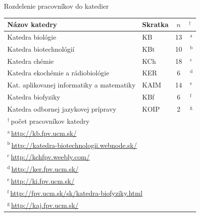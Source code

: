 \documentclass{beamer}
\begin{document}
%
%
\begin{frame}{Rozdelenie pracovníkov do katedier}
  \begin{table}
    \footnotesize
    \begin{tabular}{llc@{}l}
      \toprule
      Názov katedry & Skratka & $n$&$^\dagger$ \\
      \midrule
      Katedra biológie                          & KB   & 13&\,$^{\mathrm{a}}$ \\
      Katedra biotechnológií                    & KBt  & 10&\,$^{\mathrm{b}}$ \\
      Katedra chémie                            & KCh  & 18&\,$^{\mathrm{c}}$ \\
      Katedra ekochémie a rádiobiológie         & KER  & \phantom{1}6&\,$^{\mathrm{d}}$ \\
      Kat. aplikovanej informatiky a matematiky & KAIM & 14&\,$^{\mathrm{e}}$ \\
      Katedra biofyziky                         & KBf  & \phantom{1}6&\,$^{\mathrm{f}}$ \\
      Katedra odbornej jazykovej prípravy       & KOIP & \phantom{1}2&\,$^{\mathrm{g}}$ \\
      \bottomrule
      \multicolumn{4}{l}{\tiny $^\dagger$\,počet pracovníkov katedry} \\
      \multicolumn{4}{l}{\tiny $^{\mathrm{a}}$\,\url{http://kb.fpv.ucm.sk/}} \\
      \multicolumn{4}{l}{\tiny $^{\mathrm{b}}$\,\url{http://katedra-biotechnologii.webnode.sk/}} \\
      \multicolumn{4}{l}{\tiny $^{\mathrm{c}}$\,\url{http://kchfpv.weebly.com/}} \\
      \multicolumn{4}{l}{\tiny $^{\mathrm{d}}$\,\url{http://ker.fpv.ucm.sk/}} \\
      \multicolumn{4}{l}{\tiny $^{\mathrm{e}}$\,\url{http://ki.fpv.ucm.sk/}} \\
      \multicolumn{4}{l}{\tiny $^{\mathrm{f}}$\,\url{http://fpv.ucm.sk/sk/katedra-biofyziky.html}} \\
      \multicolumn{4}{l}{\tiny $^{\mathrm{g}}$\,\url{http://kaj.fpv.ucm.sk/}} \\
    \end{tabular}
  \end{table}
\end{frame}

%
%
\end{document}
